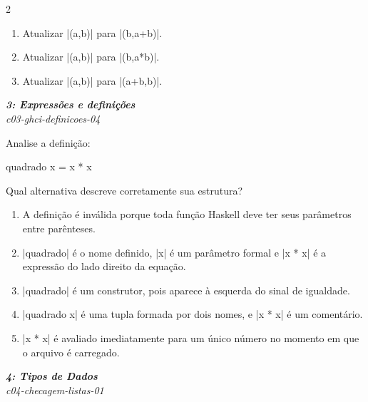 \documentclass[a4paper,10pt,brazil]{article}
\begin{document}
\begin{multicols}{2}
\begin{enumerate}
  \item Atualizar \haskellinline|(a,b)| para \haskellinline|(b,a+b)|.

  \item Atualizar \haskellinline|(a,b)| para \haskellinline|(b,a*b)|.

  \item Atualizar \haskellinline|(a,b)| para \haskellinline|(a+b,b)|.


\end{enumerate}

\begin{flushright}
  \footnotesize
  \textit{\textbf{3: Expressões e definições}}\\
  \textit{c03-ghci-definicoes-04}\\

\end{flushright}
Analise a definição:

\begin{haskellcode}
quadrado x = x * x
\end{haskellcode}

Qual alternativa descreve corretamente sua estrutura?

\begin{enumerate}
  \item A definição é inválida porque toda função Haskell deve ter seus parâmetros entre parênteses.

  \item \haskellinline|quadrado| é o nome definido, \haskellinline|x| é um parâmetro formal e \haskellinline|x * x| é a expressão do lado direito da equação.

  \item \haskellinline|quadrado| é um construtor, pois aparece à esquerda do sinal de igualdade.

  \item \haskellinline|quadrado x| é uma tupla formada por dois nomes, e \haskellinline|x * x| é um comentário.

  \item \haskellinline|x * x| é avaliado imediatamente para um único número no momento em que o arquivo é carregado.


\end{enumerate}

\begin{flushright}
  \footnotesize
  \textit{\textbf{4: Tipos de Dados}}\\
  \textit{c04-checagem-listas-01}\\


\end{flushright}
\end{multicols}
\end{document}
